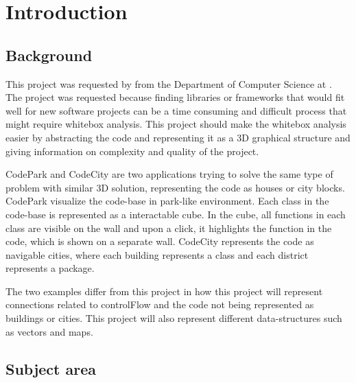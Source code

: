 \chapter{Introduction}
\label{chap:introduction}

\section{Background}
This project was requested by \productowner{} from the Department of Computer Science at \NTNUgjovik. The project was requested because finding libraries or frameworks that would fit well for new software projects can be a time consuming and difficult process that might require \gls{whitebox} analysis. This project should make the \gls{whitebox} analysis easier by abstracting the code and representing it as a 3D graphical structure and giving information on complexity and quality of the project. 

CodePark \cite{DBLP:journals/corr/abs-1708-02174} and CodeCity \cite{wettel2010software} are two applications trying to solve the same type of problem with similar 3D solution, representing the code as houses or city blocks. CodePark visualize the code-base in park-like environment. Each class in the code-base is represented as a interactable cube. In the cube, all functions in each class are visible on the wall and upon a click, it highlights the function in the code, which is shown on a separate wall. CodeCity represents the code as navigable cities, where each building represents a class and each district represents a package.

The two examples differ from this project in how this project will represent connections related to \gls{controlFlow} and the code not being represented as buildings or cities. This project will also represent different data-structures such as vectors and maps.

\section{Subject area}


